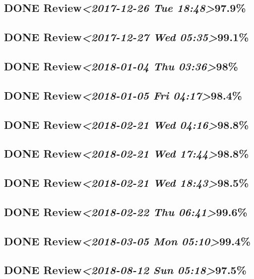 \documentclass[11pt]{ctexart}
\begin{document}
\subsection{{\bfseries\sffamily DONE} Review\textit{<2017-12-26 Tue 18:48>}97.9\%}
\label{sec:org2422090}
\subsection{{\bfseries\sffamily DONE} Review\textit{<2017-12-27 Wed 05:35>}99.1\%}
\label{sec:org8c71f6e}
\subsection{{\bfseries\sffamily DONE} Review\textit{<2018-01-04 Thu 03:36>}98\%}
\label{sec:org199eca0}
\subsection{{\bfseries\sffamily DONE} Review\textit{<2018-01-05 Fri 04:17>}98.4\%}
\label{sec:org80477e0}
\subsection{{\bfseries\sffamily DONE} Review\textit{<2018-02-21 Wed 04:16>}98.8\%}
\label{sec:orgf171d9e}
\subsection{{\bfseries\sffamily DONE} Review\textit{<2018-02-21 Wed 17:44>}98.8\%}
\label{sec:org3625e2f}
\subsection{{\bfseries\sffamily DONE} Review\textit{<2018-02-21 Wed 18:43>}98.5\%}
\label{sec:org9a913d7}
\subsection{{\bfseries\sffamily DONE} Review\textit{<2018-02-22 Thu 06:41>}99.6\%}
\label{sec:orgff3547c}
\subsection{{\bfseries\sffamily DONE} Review\textit{<2018-03-05 Mon 05:10>}99.4\%}
\label{sec:org755edf8}
\subsection{{\bfseries\sffamily DONE} Review\textit{<2018-08-12 Sun 05:18>}97.5\%}
\label{sec:org54e8ea6}
\end{document}
